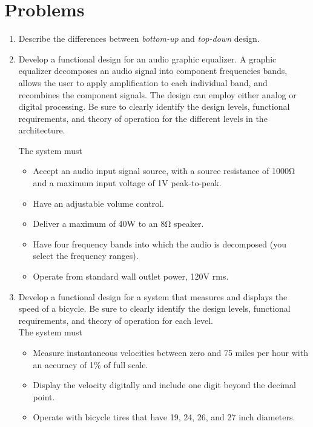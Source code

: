 \section{Problems}
\label{section:funcDecomProblems}

\begin{enumerate}
\def\labelenumi{\arabic{enumi}.}
\item
  Describe the differences between \emph{bottom-up} and \emph{top-down}
  design.
\item
  Develop a functional design for an audio graphic equalizer. A graphic
  equalizer decomposes an audio signal into component frequencies bands,
  allows the user to apply amplification to each individual band, and
  recombines the component signals. The design can employ either analog
  or digital processing. Be sure to clearly identify the design levels,
  functional requirements, and theory of operation for the different
  levels in the architecture.

The system must
\begin{itemize}
\item
  Accept an audio input signal source, with a source resistance of 1000Ω
  and a maximum input voltage of 1V peak-to-peak.
\item
  Have an adjustable volume control.
\item
  Deliver a maximum of 40W to an 8Ω speaker.
\item
  Have four frequency bands into which the audio is decomposed (you
  select the frequency ranges).
\item
  Operate from standard wall outlet power, 120V rms.
  \end{itemize}
  
  \item
    Develop a functional design for a system that measures and displays
    the speed of a bicycle. Be sure to clearly identify the design
    levels, functional requirements, and theory of operation for each
    level.\\
  The system must

\begin{itemize}
\item
  Measure instantaneous velocities between zero and 75 miles per hour
  with an accuracy of 1\% of full scale.
\item
  Display the velocity digitally and include one digit beyond the
  decimal point.
\item
  Operate with bicycle tires that have 19, 24, 26, and 27 inch
  diameters.
\end{itemize}


\end{enumerate}
